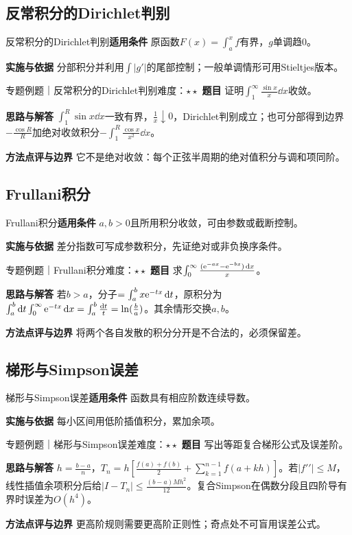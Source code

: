 \subsection{反常积分的Dirichlet判别}\label{mat:integral_analysis:dirichlet}
\begin{method}{反常积分的Dirichlet判别}\textbf{适用条件} 原函数$F(x)=\int_a^xf$有界，$g$单调趋0。\par\textbf{实施与依据} 分部积分并利用$\int|g\prime|$的尾部控制；一般单调情形可用Stieltjes版本。\end{method}
\begin{example}{专题例题｜反常积分的Dirichlet判别}{难度：$\star\star$}
\textbf{题目} 证明$\int_1^\infty\frac{\sin x}{x}\dd x$收敛。\par\textbf{思路与解答} $\int_1^R\sin x\dd x$一致有界，$\frac{1}{x}\downarrow0$，Dirichlet判别成立；也可分部得到边界$-\frac{\cos R}{R}$加绝对收敛积分$-\int_1^R\frac{\cos x}{x^2}\dd x$。\par\textbf{方法点评与边界} 它不是绝对收敛：每个正弦半周期的绝对值积分与调和项同阶。
\end{example}
\subsection{Frullani积分}\label{mat:integral_analysis:frullani}
\begin{method}{Frullani积分}\textbf{适用条件} $a,b>0$且所用积分收敛，可由参数或截断控制。\par\textbf{实施与依据} 差分指数可写成参数积分，先证绝对或非负换序条件。\end{method}
\begin{example}{专题例题｜Frullani积分}{难度：$\star\star$}
\textbf{题目} 求$\int_0^\infty\frac{(\mathrm{e}^{-ax}-\mathrm{e}^{-bx})\mathop{}\!\mathrm{d} x}{x}$。\par\textbf{思路与解答} 若$b>a$，分子$=\int_a^b x\mathrm{e}^{-tx}\mathop{}\!\mathrm{d} t$，原积分为$\int_a^b\mathop{}\!\mathrm{d} t\int_0^\infty\mathrm{e}^{-tx}\mathop{}\!\mathrm{d} x=\int_a^b\frac{\mathop{}\!\mathrm{d} t}{t}=\ln(\frac{b}{a})$。其余情形交换$a,b$。\par\textbf{方法点评与边界} 将两个各自发散的积分分开是不合法的，必须保留差。
\end{example}
\subsection{梯形与Simpson误差}\label{mat:integral_analysis:numerical}
\begin{method}{梯形与Simpson误差}\textbf{适用条件} 函数具有相应阶数连续导数。\par\textbf{实施与依据} 每小区间用低阶插值积分，累加余项。\end{method}
\begin{example}{专题例题｜梯形与Simpson误差}{难度：$\star\star$}
\textbf{题目} 写出等距复合梯形公式及误差阶。\par\textbf{思路与解答} $h=\frac{b-a}{n}$，$T_n=h[\frac{f(a)+f(b)}{2}+\sum_{k=1}^{n-1}f(a+kh)]$。若$|f\prime\prime|\le M$，线性插值余项积分后给$|I-T_n|\le\frac{(b-a)Mh^2}{12}$。复合Simpson在偶数分段且四阶导有界时误差为$O(h^4)$。\par\textbf{方法点评与边界} 更高阶规则需要更高阶正则性；奇点处不可盲用误差公式。
\end{example}
